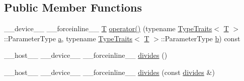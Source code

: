 \subsection*{Public Member Functions}
\begin{DoxyCompactItemize}
\item 
\-\_\-\-\_\-device\-\_\-\-\_\- \-\_\-\-\_\-forceinline\-\_\-\-\_\- \hyperlink{calib3d_8hpp_a3efb9551a871ddd0463079a808916717}{T} \hyperlink{structcv_1_1gpu_1_1device_1_1divides_ab7bf6445dcabdc1abf7ca8bcb42d5578}{operator()} (typename \hyperlink{structcv_1_1gpu_1_1device_1_1TypeTraits}{Type\-Traits}$<$ \hyperlink{calib3d_8hpp_a3efb9551a871ddd0463079a808916717}{T} $>$\-::Parameter\-Type \hyperlink{legacy_8hpp_a1031d0e0a97a340abfe0a6ab9e831045}{a}, typename \hyperlink{structcv_1_1gpu_1_1device_1_1TypeTraits}{Type\-Traits}$<$ \hyperlink{calib3d_8hpp_a3efb9551a871ddd0463079a808916717}{T} $>$\-::Parameter\-Type \hyperlink{legacy_8hpp_ac04272e8ca865b8fba18d36edae9fd2a}{b}) const 
\item 
\-\_\-\-\_\-host\-\_\-\-\_\- \-\_\-\-\_\-device\-\_\-\-\_\- \-\_\-\-\_\-forceinline\-\_\-\-\_\- \hyperlink{structcv_1_1gpu_1_1device_1_1divides_a6b146d96dad67344b8843b19db12d3b5}{divides} ()
\item 
\-\_\-\-\_\-host\-\_\-\-\_\- \-\_\-\-\_\-device\-\_\-\-\_\- \-\_\-\-\_\-forceinline\-\_\-\-\_\- \hyperlink{structcv_1_1gpu_1_1device_1_1divides_a7462af90bcb93912922cbba0f067294f}{divides} (const \hyperlink{structcv_1_1gpu_1_1device_1_1divides}{divides} \&)
\end{DoxyCompactItemize}


